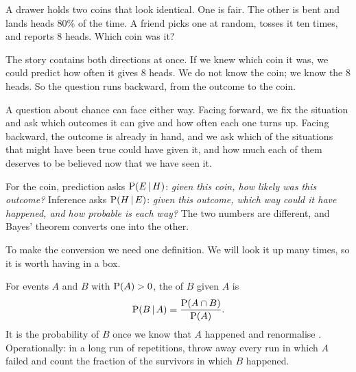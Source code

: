 \begin{story}
A drawer holds two coins that look identical. One is fair. The other is
bent and lands heads 80\% of the time. A friend picks one at random, tosses
it ten times, and reports 8 heads. Which coin was it?

\smallskip{}
\end{story}

The story contains both directions at once. If we knew which coin it was, we
could predict how often it gives 8 heads. We do not know the coin; we know the
8 heads. So the question runs backward, from the outcome to the coin.

\begin{framing}
A question about chance can face either way. Facing forward, we fix the
situation and ask which outcomes it can give and how often each one turns up.
Facing backward, the outcome is already in hand, and we ask which of the
situations that might have been true could have given it, and how much each
of them deserves to be believed now that we have seen it.

For the coin, prediction asks $\operatorname{P}(E\,\vert\, H)$: \emph{given this coin, how likely was
this outcome?} Inference asks $\operatorname{P}(H\,\vert\, E)$: \emph{given this outcome,
which way could it have happened, and how probable is each way?} The two
numbers are different, and Bayes' theorem converts one into the other.

\smallskip{}
\end{framing}

To make the conversion we need one definition. We will look it up many times,
so it is worth having in a box.

\begin{workdef}
For events $A$ and $B$ with $\operatorname{P}(A)>0$, the  of $B$ given $A$ is
\[
  \operatorname{P}(B\,\vert\, A)=\frac{\operatorname{P}(A\cap B)}{\operatorname{P}(A)} .
\]
It is the probability of $B$ once we know that $A$ happened
 and
renormalise . Operationally: in a long run of repetitions, throw away
every run in which $A$ failed and count the fraction of the survivors in
which $B$ happened.

\smallskip{}
\end{workdef}

